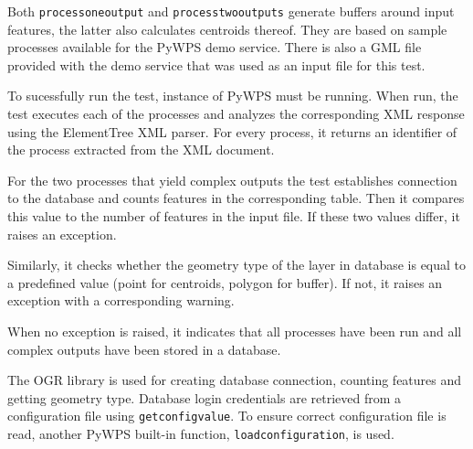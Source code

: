 Both \texttt{process\textunderscore one\textunderscore output} and \texttt{process\textunderscore two\textunderscore outputs} generate buffers around input features, the latter also calculates centroids thereof. They are based on sample processes available for the PyWPS demo service. There is also a GML file provided with the demo service that was used as an input file for this test.  

To sucessfully run the test, instance of PyWPS must be running. When run, the test executes each of the processes and analyzes the corresponding XML response using the ElementTree XML parser. For every process, it returns an identifier of the process extracted from the XML document. 

For the two processes that yield complex outputs the test establishes connection to the database and counts features in the corresponding table. Then it compares this value to the number of features in the input file. If these two values differ, it raises an exception.

Similarly, it checks whether the geometry type of the layer in database is equal to a predefined value (point for centroids, polygon for buffer). If not, it raises an exception with a corresponding warning. 

When no exception is raised, it indicates that all processes have been run and all complex outputs have been stored in a database.

The OGR library is used for creating database connection, counting features and getting geometry type. Database login credentials are retrieved from a configuration file using \texttt{get\textunderscore config\textunderscore value}. To ensure correct configuration file is read, another PyWPS built-in function, \texttt{load\textunderscore configuration}, is used.








